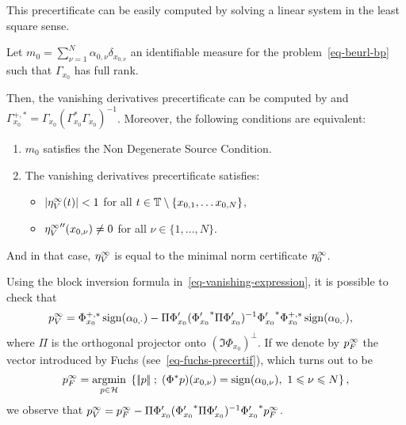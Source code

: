 This precertificate can be easily computed by solving a linear system in the least square sense. 

\begin{prop}
  Let $m_0=\sum_{\nu=1}^N\alpha_{0,\nu} \delta_{x_{0,\nu}}$ an identifiable measure for the problem~\eqref{eq-beurl-bp} such that $\Gamma_{x_0}$ has full rank.
  
  Then, the vanishing derivatives precertificate can be computed by 
     and $\Gamma_{x_0}^{+,*}=\Gamma_{x_0}(\Gamma_{x_0}^*\Gamma_{x_0})^{-1}$.
Moreover, the following conditions are equivalent:
  \begin{enumerate}
    \item $m_0$ satisfies the Non Degenerate Source Condition.
    \item The vanishing derivatives precertificate satisfies:
      \begin{itemize}
        \item $|{\eta^{\infty}_V}(t)|<1$ for all $t\in \mathbb{T}\setminus \{x_{0,1},\ldots x_{0,N} \}$,
        \item ${\eta^{\infty}_V}''(x_{0,\nu})\neq 0$ for all $\nu\in\{1,\ldots,N\}$.
      \end{itemize}
   \end{enumerate}
   And in that case, ${\eta^{\infty}_V}$ is equal to the minimal norm certificate ${\eta_0^{\infty}}$.
   \label{prop-etav-nonvanish}
\end{prop}

\begin{rem}\label{rem-vanishing-formula}
  Using the block inversion formula in~\eqref{eq-vanishing-expression}, it is possible to check that 
  \begin{align}
    {p^{\infty}_V}&=\Phi_{x_0}^{+,*}\operatorname{sign}(\alpha_{0,\cdot}) - \Pi \Phi_{x_0}' ({\Phi_{x_0}'}^*\Pi \Phi_{x_0}')^{-1}{\Phi_{x_0}'}^*\Phi_{x_0}^{+,*}\operatorname{sign}(\alpha_{0,\cdot}),\label{eq-vanishing-formula}
  \end{align} where $\Pi$ is the orthogonal projector onto $(\Im \Phi_{x_0})^\perp$. If we denote by ${p^{\infty}_F}$ the vector introduced by Fuchs (see~\eqref{eq-fuchs-precertif}), which turns out to be
  \begin{align*}
    {p^{\infty}_F}= \underset{p\in\mathcal{H}}{\operatorname{argmin}}\; \left\{ |\!| p |\!| \;;\; (\Phi^* p)(x_{0,\nu}) = \operatorname{sign}(\alpha_{0,\nu}), \ 1\leqslant \nu\leqslant N \right\},
  \end{align*}
  we observe that ${p^{\infty}_V} = {p^{\infty}_F} - \Pi \Phi_{x_0}' ({\Phi_{x_0}'}^*\Pi \Phi_{x_0}')^{-1}{\Phi_{x_0}'}^*{p^{\infty}_F}$.
\end{rem}

